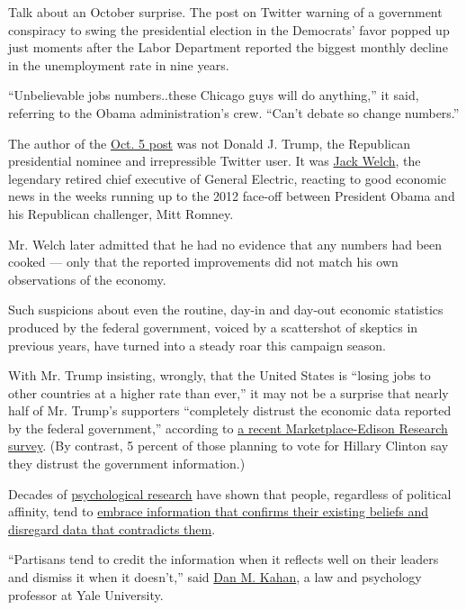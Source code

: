Talk about an October surprise. The post on Twitter warning of a
government conspiracy to swing the presidential election in the
Democrats' favor popped up just moments after the Labor Department
reported the biggest monthly decline in the unemployment rate in nine
years.

``Unbelievable jobs numbers..these Chicago guys will do anything,'' it
said, referring to the Obama administration's crew. ``Can't debate so
change numbers.''

The author of the
\href{https://twitter.com/jack_welch/status/254198154260525057}{Oct. 5
post} was not Donald J. Trump, the Republican presidential nominee and
irrepressible Twitter user. It was
\href{http://money.cnn.com/2012/10/05/news/economy/welch-unemployment-rate/}{Jack
Welch}, the legendary retired chief executive of General Electric,
reacting to good economic news in the weeks running up to the 2012
face-off between President Obama and his Republican challenger, Mitt
Romney.

Mr. Welch later admitted that he had no evidence that any numbers had
been cooked --- only that the reported improvements did not match his
own observations of the economy.

Such suspicions about even the routine, day-in and day-out economic
statistics produced by the federal government, voiced by a scattershot
of skeptics in previous years, have turned into a steady roar this
campaign season.

With Mr. Trump insisting, wrongly, that the United States is ``losing
jobs to other countries at a higher rate than ever,'' it may not be a
surprise that nearly half of Mr. Trump's supporters ``completely
distrust the economic data reported by the federal government,''
according to
\href{http://www.marketplace.org/2016/10/13/economy/americans-economic-anxiety-has-reached-new-high}{a
recent Marketplace-Edison Research survey}. (By contrast, 5 percent of
those planning to vote for Hillary Clinton say they distrust the
government information.)

Decades of
\href{http://www.theatlantic.com/magazine/archive/2011/12/i-was-wrong-and-so-are-you/308713/}{psychological
research} have shown that people, regardless of political affinity, tend
to
\href{https://www.psychologytoday.com/blog/science-choice/201504/what-is-confirmation-bias}{embrace
information that confirms their existing beliefs and disregard data that
contradicts them}.

``Partisans tend to credit the information when it reflects well on
their leaders and dismiss it when it doesn't,'' said
\href{http://www.culturalcognition.net/kahan/}{Dan M. Kahan}, a law and
psychology professor at Yale University.

